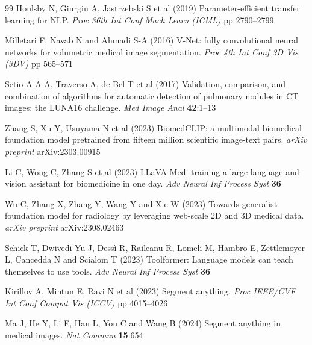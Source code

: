 \documentclass[lineno,referee,pdflatex,sn-mathphys-num]{sn-jnl}
\begin{document}
\begin{thebibliography}{99}
Houlsby N, Giurgiu A, Jastrzebski S et al (2019)
Parameter-efficient transfer learning for NLP.
\textit{Proc 36th Int Conf Mach Learn (ICML)} pp 2790--2799

Milletari F, Navab N and Ahmadi S-A (2016)
V-Net: fully convolutional neural networks for volumetric medical image
segmentation.
\textit{Proc 4th Int Conf 3D Vis (3DV)} pp 565--571

Setio A A A, Traverso A, de Bel T et al (2017)
Validation, comparison, and combination of algorithms for automatic
detection of pulmonary nodules in CT images: the LUNA16 challenge.
\textit{Med Image Anal} \textbf{42}:1--13

Zhang S, Xu Y, Usuyama N et al (2023)
BiomedCLIP: a multimodal biomedical foundation model pretrained from
fifteen million scientific image-text pairs.
\textit{arXiv preprint} arXiv:2303.00915

Li C, Wong C, Zhang S et al (2023)
LLaVA-Med: training a large language-and-vision assistant for
biomedicine in one day.
\textit{Adv Neural Inf Process Syst} \textbf{36}

Wu C, Zhang X, Zhang Y, Wang Y and Xie W (2023)
Towards generalist foundation model for radiology by leveraging
web-scale 2D and 3D medical data.
\textit{arXiv preprint} arXiv:2308.02463

Schick T, Dwivedi-Yu J, Dess\`{i} R, Raileanu R, Lomeli M, Hambro E,
Zettlemoyer L, Cancedda N and Scialom T (2023)
Toolformer: Language models can teach themselves to use tools.
\textit{Adv Neural Inf Process Syst} \textbf{36}

Kirillov A, Mintun E, Ravi N et al (2023)
Segment anything.
\textit{Proc IEEE/CVF Int Conf Comput Vis (ICCV)} pp 4015--4026

Ma J, He Y, Li F, Han L, You C and Wang B (2024)
Segment anything in medical images.
\textit{Nat Commun} \textbf{15}:654

\end{thebibliography}
\end{document}
